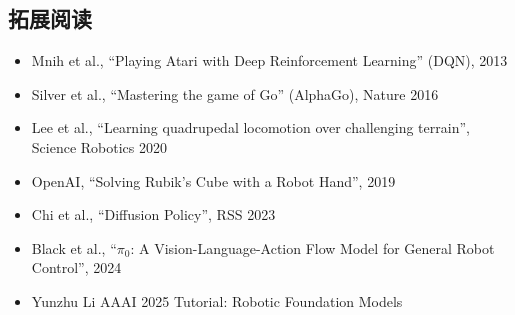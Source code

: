 \documentclass[a4paper]{article}
\begin{document}
\subsection{拓展阅读}

\begin{itemize}
    \item Mnih et al., ``Playing Atari with Deep Reinforcement Learning'' (DQN), 2013
    \item Silver et al., ``Mastering the game of Go'' (AlphaGo), Nature 2016
    \item Lee et al., ``Learning quadrupedal locomotion over challenging terrain'', Science Robotics 2020
    \item OpenAI, ``Solving Rubik's Cube with a Robot Hand'', 2019
    \item Chi et al., ``Diffusion Policy'', RSS 2023
    \item Black et al., ``$\pi_0$: A Vision-Language-Action Flow Model for General Robot Control'', 2024
    \item Yunzhu Li AAAI 2025 Tutorial: Robotic Foundation Models
\end{itemize}
\end{document}
